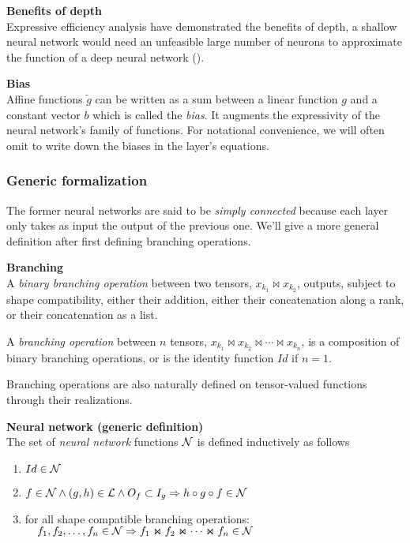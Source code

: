 \begin{remark}\textbf{Benefits of depth}\\
Expressive efficiency analysis have demonstrated the benefits of depth, \ie a shallow neural network would need an unfeasible large number of neurons to approximate the function of a deep neural network (\eg \cite{delalleau2011shallow,bianchini2014complexity,poggio2015theory,eldan2016power,poole2016exponential,raghu2016expressive,cohen2016convolutional,mhaskar2016learning,lin2017does,arora2018understanding}).
\end{remark}

\begin{remark}\textbf{Bias}\\
Affine functions $\widetilde{g}$ can be written as a sum between a linear function $g$ and a constant vector $b$ which is called the \emph{bias}. It augments the expressivity of the neural network's family of functions. For notational convenience, we will often omit to write down the biases in the layer's equations.
\end{remark}

\subsubsection{Generic formalization}

The former neural networks are said to be \emph{simply connected} because each layer only takes as input the output of the previous one. We'll give a more general definition after first defining branching operations.

\begin{definition}\textbf{Branching}\\
A \emph{binary branching operation} between two tensors, $x_{k_1} \Join x_{k_2}$, outputs, subject to shape compatibility, either their addition, either their concatenation along a rank, or their concatenation as a list.

A \emph{branching operation} between $n$ tensors, $x_{k_1} \Join x_{k_2} \Join \cdots \Join x_{k_n}$, is a composition of binary branching operations, or is the identity function $Id$ if $n = 1$.

Branching operations are also naturally defined on tensor-valued functions through their realizations.
\end{definition}

\begin{definition}\textbf{Neural network (generic definition)}\\
The set of \emph{neural network} functions $\mathcal{N}$ is defined inductively as follows
\begin{enumerate}
  \item $Id \in \mathcal{N}$
  \item $f \in \mathcal{N} \wedge (g,h) \in \mathcal{L} \wedge O_f \subset I_g \Rightarrow h \circ g \circ f \in \mathcal{N}$
  \item for all shape compatible branching operations:\\
  $\quad f_1, f_2, \ldots, f_n \in \mathcal{N} \Rightarrow  f_1 \Join f_2 \Join \cdots \Join f_n \in \mathcal{N}$
\end{enumerate}
\label{def:nn2}
\end{definition}

